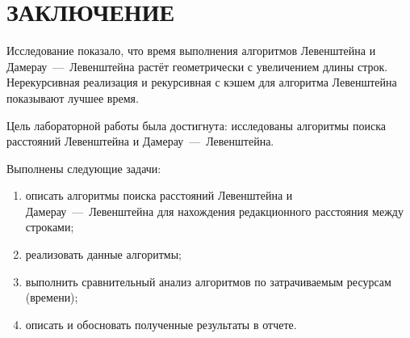 \chapter*{\hfill{\centering  ЗАКЛЮЧЕНИЕ}\hfill}

Исследование показало, что время выполнения алгоритмов Левенштейна и Дамерау~---~Левенштейна растёт геометрически с увеличением длины строк. Нерекурсивная реализация и рекурсивная с кэшем для алгоритма Левенштейна показывают лучшее время.

Цель лабораторной работы была достигнута: исследованы алгоритмы поиска расстояний Левенштейна и Дамерау~---~Левенштейна.

Выполнены следующие задачи:
\begin{enumerate}
    \item описать алгоритмы поиска расстояний Левенштейна и Дамерау~---~Левенштейна для нахождения редакционного расстояния между строками;
    \item реализовать данные алгоритмы;
    \item выполнить сравнительный анализ алгоритмов по затрачиваемым ресурсам (времени);
    \item описать и обосновать полученные результаты в отчете.
\end{enumerate}
